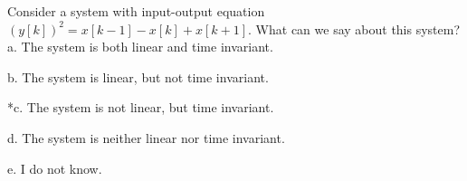 
Consider a system with input-output equation $(y[k])^{2}=x[k-1]-x[k]+x[k+1]$. What can we say about this system?\\

a. The system is both linear and time invariant.

b. The system is linear, but not time invariant.

*c. The system is not linear, but time invariant.

d. The system is neither linear nor time invariant.

e. I do not know.\\
